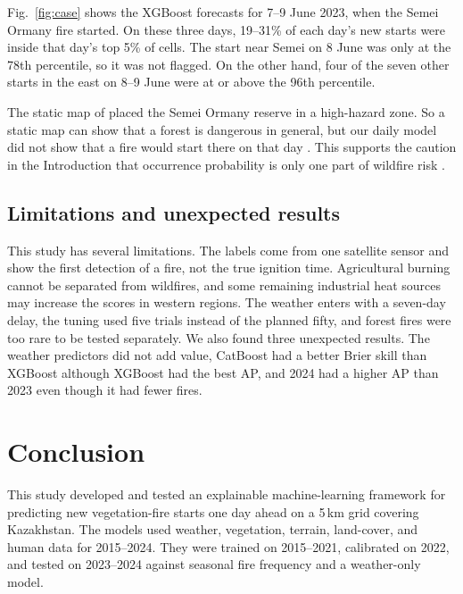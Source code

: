 Fig.~\ref{fig:case} shows the XGBoost forecasts for 7--9 June 2023, when the Semei Ormany fire started. On these three days, 19--31\% of each day's new starts were inside that day's top 5\% of cells. The start near Semei on 8 June was only at the 78th percentile, so it was not flagged. On the other hand, four of the seven other starts in the east on 8--9 June were at or above the 96th percentile.

The static map of \cite{chepashev2025maxent} placed the Semei Ormany reserve in a high-hazard zone. So a static map can show that a forest is dangerous in general, but our daily model did not show that a fire would start there on that day \cite{sentinel2023abayfire}. This supports the caution in the Introduction that occurrence probability is only one part of wildfire risk \cite{dossi2026infrastructure,berchtold2025tipping}.

\subsection{Limitations and unexpected results}\label{sec:res_limits}

This study has several limitations. The labels come from one satellite sensor and show the first detection of a fire, not the true ignition time. Agricultural burning cannot be separated from wildfires, and some remaining industrial heat sources may increase the scores in western regions. The weather enters with a seven-day delay, the tuning used five trials instead of the planned fifty, and forest fires were too rare to be tested separately. We also found three unexpected results. The weather predictors did not add value, CatBoost had a better Brier skill than XGBoost although XGBoost had the best AP, and 2024 had a higher AP than 2023 even though it had fewer fires.

\section{Conclusion}\label{sec:conclusion}

This study developed and tested an explainable machine-learning framework for predicting new vegetation-fire starts one day ahead on a 5\,km grid covering Kazakhstan. The models used weather, vegetation, terrain, land-cover, and human data for 2015--2024. They were trained on 2015--2021, calibrated on 2022, and tested on 2023--2024 against seasonal fire frequency and a weather-only model.

